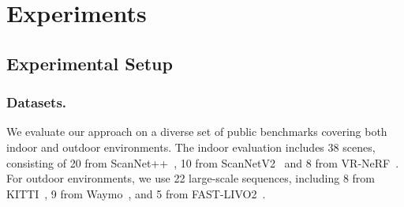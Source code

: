 \section{Experiments}
\label{sec:exp}

\subsection{Experimental Setup}
\subsubsection{Datasets.}
We evaluate our approach on a diverse set of public benchmarks covering both indoor and outdoor environments. 
The indoor evaluation includes 38 scenes, consisting of 20 from ScanNet++~\cite{yeshwanth2023scannet++}, 10 from ScanNetV2~\cite{dai2017scannet} and 8 from VR-NeRF~\cite{xu2023vr}.
For outdoor environments, we use 22 large-scale sequences, including 8 from KITTI~\cite{geiger2012we}, 9 from Waymo~\cite{sun2020scalability}, and 5 from FAST-LIVO2~\cite{zheng2024fast}.


\begin{table}[t!]
\centering
\renewcommand{\arraystretch}{1.1} %
\setlength{\tabcolsep}{3.5pt}
\caption{\textbf{Tracking comparisons} in terms of ATE RMSE (m). 
We compare against state-of-the-art SLAM frameworks on both indoor and outdoor datasets. 
The best and second-best results are highlighted in \textbf{bold} and \underline{underline}, respectively.}
\label{tab:tracking_ate_comparison}



\end{table}


